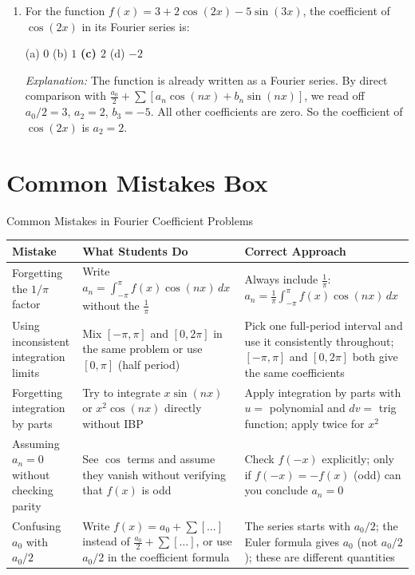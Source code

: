 \documentclass[12pt,a4paper]{article}
\begin{document}
\begin{enumerate}[label=\textbf{MCQ \arabic*.}]
\textit{Explanation:} For period $2T$, the orthogonality result gives $\int_{-T}^{T}\sin(m\pi x/T)\sin(n\pi x/T)\,dx = T$ when $m=n$, so $b_n = \frac{1}{T}\int_{-T}^{T}f(x)\sin(n\pi x/T)\,dx$. Option (b) is correct.

\item For the function $f(x) = 3 + 2\cos(2x) - 5\sin(3x)$, the coefficient of $\cos(2x)$ in its Fourier series is:

(a) $0$ \quad (b) $1$ \quad \textbf{(c) $2$} \quad (d) $-2$

\textit{Explanation:} The function is already written as a Fourier series. By direct comparison with $\frac{a_0}{2} + \sum[a_n\cos(nx) + b_n\sin(nx)]$, we read off $a_0/2 = 3$, $a_2 = 2$, $b_3 = -5$. All other coefficients are zero. So the coefficient of $\cos(2x)$ is $a_2 = 2$.

\end{enumerate}

\section{Common Mistakes Box}

\begin{mistakebox}{Common Mistakes in Fourier Coefficient Problems}
\begin{tabular}{p{4cm} p{5cm} p{5cm}}
\toprule
\textbf{Mistake} & \textbf{What Students Do} & \textbf{Correct Approach} \\
\midrule
Forgetting the $1/\pi$ factor &
Write $a_n = \int_{-\pi}^{\pi}f(x)\cos(nx)\,dx$ without the $\frac{1}{\pi}$ &
Always include $\frac{1}{\pi}$: $a_n = \frac{1}{\pi}\int_{-\pi}^{\pi}f(x)\cos(nx)\,dx$ \\
\midrule
Using inconsistent integration limits &
Mix $[-\pi,\pi]$ and $[0,2\pi]$ in the same problem or use $[0,\pi]$ (half period) &
Pick one full-period interval and use it consistently throughout; $[-\pi,\pi]$ and $[0,2\pi]$ both give the same coefficients \\
\midrule
Forgetting integration by parts &
Try to integrate $x\sin(nx)$ or $x^2\cos(nx)$ directly without IBP &
Apply integration by parts with $u =$ polynomial and $dv =$ trig function; apply twice for $x^2$ \\
\midrule
Assuming $a_n = 0$ without checking parity &
See $\cos$ terms and assume they vanish without verifying that $f(x)$ is odd &
Check $f(-x)$ explicitly; only if $f(-x) = -f(x)$ (odd) can you conclude $a_n = 0$ \\
\midrule
Confusing $a_0$ with $a_0/2$ &
Write $f(x) = a_0 + \sum[\ldots]$ instead of $\frac{a_0}{2} + \sum[\ldots]$, or use $a_0/2$ in the coefficient formula &
The series starts with $a_0/2$; the Euler formula gives $a_0$ (not $a_0/2$); these are different quantities \\
\bottomrule
\end{tabular}
\end{mistakebox}
\end{document}
